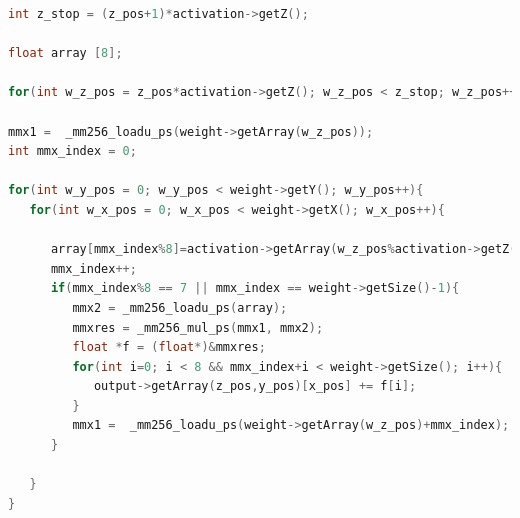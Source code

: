 \documentclass[../main.tex]{subfiles}
\begin{document}
\begin{lstlisting}[language=c++, caption=Implementierung des Convolutional Layers mit AVX, captionpos=b, label=listing:conv_avx, frame=single, linewidth=\textwidth, breaklines=true]
int z_stop = (z_pos+1)*activation->getZ();

float array [8];

for(int w_z_pos = z_pos*activation->getZ(); w_z_pos < z_stop; w_z_pos++){

mmx1 =  _mm256_loadu_ps(weight->getArray(w_z_pos));
int mmx_index = 0;

for(int w_y_pos = 0; w_y_pos < weight->getY(); w_y_pos++){
   for(int w_x_pos = 0; w_x_pos < weight->getX(); w_x_pos++){
   
      array[mmx_index%8]=activation->getArray(w_z_pos%activation->getZ(), y_pos+w_y_pos)[x_pos+w_x_pos];
      mmx_index++;
      if(mmx_index%8 == 7 || mmx_index == weight->getSize()-1){
         mmx2 = _mm256_loadu_ps(array);
         mmxres = _mm256_mul_ps(mmx1, mmx2);
         float *f = (float*)&mmxres;
         for(int i=0; i < 8 && mmx_index+i < weight->getSize(); i++){
            output->getArray(z_pos,y_pos)[x_pos] += f[i];
         }
         mmx1 =  _mm256_loadu_ps(weight->getArray(w_z_pos)+mmx_index);
      }
      
   }
}
\end{lstlisting}
\end{document}
